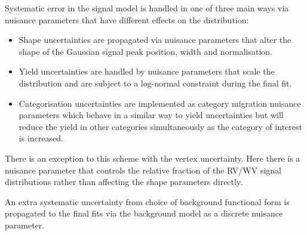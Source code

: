 Systematic error in the signal model is handled in one of three main ways via nuisance parameters that have different effects on the \mgg distribution:
\begin{itemize}[noitemsep]
    \item Shape uncertainties are propagated via nuisance parameters that alter the shape of the Gaussian signal peak position, width and normalisation.
    \item Yield uncertainties are handled by nuisance parameters that scale the \mgg distribution and are subject to a log-normal constraint during the final fit.
    \item Categorisation uncertainties are implemented as category migration nuisance parameters which behave in a similar way to yield uncertainties but will reduce the yield in other categories simultaneously as the category of interest is increased.
\end{itemize}
There is an exception to this scheme with the vertex uncertainty. Here there is a nuisance parameter that controls the relative fraction of the RV/WV signal distributions rather than affecting the shape parameters directly. 

An extra systematic uncertainty from choice of background functional form is propagated to the final fits via the background model as a discrete nuisance parameter. 



